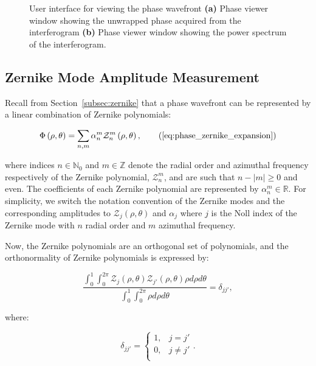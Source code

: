 \begin{figure}[h]
\begin{subfigure}{0.45\textwidth}
		\caption{}
		\label{fig:phase_viewer_ft}
	\end{subfigure}
	\caption[User interface for viewing the phase wavefront]{User interface for viewing the phase wavefront \textbf{(a)} Phase viewer window showing the unwrapped phase acquired from the interferogram \textbf{(b)} Phase viewer window showing the power spectrum of the interferogram. }
	\label{fig:phase_viewer}
\end{figure}

\subsection{Zernike Mode Amplitude Measurement}
\label{subsec:zernike_mode_measurment}

Recall from Section~\ref{subsec:zernike} that a phase wavefront can be represented by a linear combination of Zernike polynomials:

\begin{equation}
\Phi\left(\rho,\theta\right) = \sum\limits_{n,m}\alpha^{m}_{n}\mathcal{Z}^{m}_{n}\left(\rho,\theta\right),\tag{\ref{eq:phase_zernike_expansion}}
\end{equation}

where indices $n \in \mathbb{N}_{0}$ and $m \in \mathbb{Z}$ denote the radial order and azimuthal frequency respectively of the Zernike polynomial, $\mathcal{Z}^{m}_{n}$, and are such that $n - \left|m\right| \ge 0$ and even. The coefficients of each Zernike polynomial are represented by $\alpha^{m}_{n} \in \mathbb{R}$. For simplicity, we switch the notation convention of the Zernike modes and the corresponding amplitudes to $\mathcal{Z}_{j}\left(\rho,\theta\right)$ and $\alpha_{j}$ where $j$ is the Noll index of the Zernike mode with $n$ radial order and $m$ azimuthal frequency.

Now, the Zernike polynomials are an orthogonal set of polynomials, and the orthonormality of Zernike polynomials is expressed by\cite{lakshminarayanan2011zernike}:

\begin{equation}\label{eq:orthonormality}
\frac{\int_{0}^{1}\int_{0}^{2\pi}\mathcal{Z}_{j}\left(\rho,\theta\right)\mathcal{Z}_{j'}\left(\rho,\theta\right)\rho d\rho d\theta}{\int_{0}^{1}\int_{0}^{2\pi}\rho d\rho d\theta} = \delta_{jj'},
\end{equation}

where:

\begin{equation}\label{eq:delta_j}
\delta_{jj'} = 
\begin{cases}
1, & j = j'\\
0, & j \ne j'\\ 
\end{cases}.
\end{equation}

